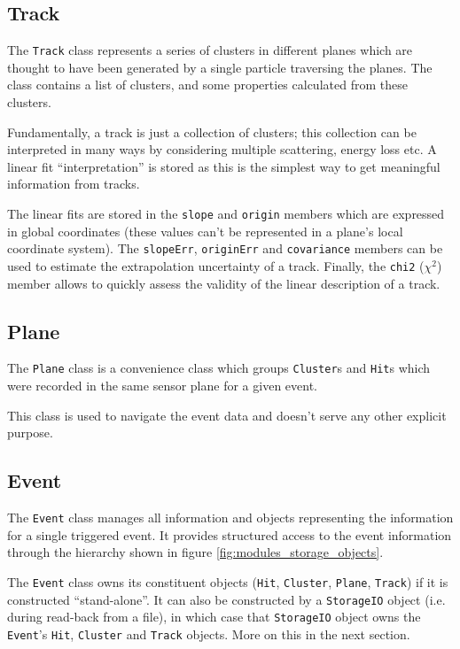 \documentclass[10pt,a4paper]{book}
\begin{document}
\subsection{Track}

The \Verb`Track` class represents a series of clusters in different planes which are thought to have been generated by a single particle traversing the planes. The class contains a list of clusters, and some properties calculated from these clusters.

Fundamentally, a track is just a collection of clusters; this collection can be interpreted in many ways by considering multiple scattering, energy loss etc. A linear fit ``interpretation'' is stored as this is the simplest way to get meaningful information from tracks.

The linear fits are stored in the \Verb`slope` and \Verb`origin` members which are expressed in global coordinates (these values can't be represented in a plane's local coordinate system). The \Verb`slopeErr`, \Verb`originErr` and \Verb`covariance` members can be used to estimate the extrapolation uncertainty of a track. Finally, the \Verb`chi2` ($\chi^2$) member allows to quickly assess the validity of the linear description of a track.

\subsection{Plane}

The \Verb`Plane` class is a convenience class which groups \Verb`Cluster`s and \Verb`Hit`s which were recorded in the same sensor plane for a given event.

This class is used to navigate the event data and doesn't serve any other explicit purpose.

\subsection{Event}

The \Verb`Event` class manages all information and objects representing the information for a single triggered event. It provides structured access to the event information through the hierarchy shown in figure \ref{fig:modules_storage_objects}.

The \Verb`Event` class owns its constituent objects (\Verb`Hit`, \Verb`Cluster`, \Verb`Plane`, \Verb`Track`) if it is constructed ``stand-alone''. It can also be constructed by a \Verb`StorageIO` object (i.e. during read-back from a file), in which case that \Verb`StorageIO` object owns the \Verb`Event`'s \Verb`Hit`, \Verb`Cluster` and \Verb`Track` objects. More on this in the next section.
\end{document}
